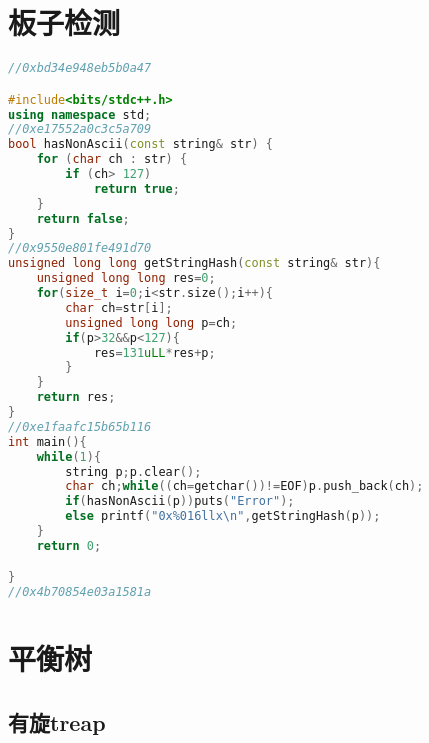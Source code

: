 \documentclass[12pt, a4paper]{article} %
\begin{document}


\section{板子检测}

\begin{lstlisting}[language=c++]
//0xbd34e948eb5b0a47

#include<bits/stdc++.h>
using namespace std;
//0xe17552a0c3c5a709
bool hasNonAscii(const string& str) {
    for (char ch : str) {
        if (ch> 127)
            return true;
    }
    return false;
}
//0x9550e801fe491d70
unsigned long long getStringHash(const string& str){
    unsigned long long res=0;
    for(size_t i=0;i<str.size();i++){
        char ch=str[i];
        unsigned long long p=ch;
        if(p>32&&p<127){
            res=131uLL*res+p;
        }
    }
    return res;
}
//0xe1faafc15b65b116
int main(){
    while(1){
        string p;p.clear();
        char ch;while((ch=getchar())!=EOF)p.push_back(ch);
        if(hasNonAscii(p))puts("Error");
        else printf("0x%016llx\n",getStringHash(p));
    }
    return 0;

}
//0x4b70854e03a1581a
\end{lstlisting}
\section{平衡树}

\subsection{有旋treap}

\begin{lstlisting}[language=c++]

\end{lstlisting}
\end{document}
